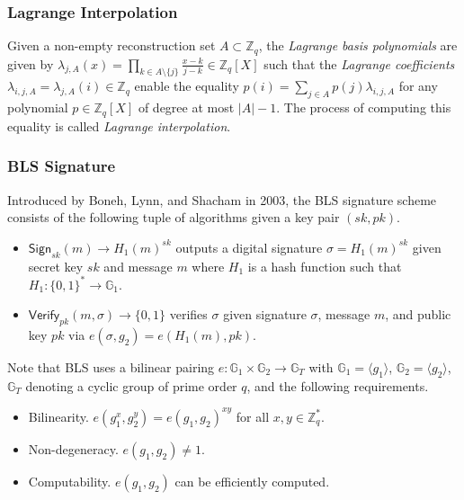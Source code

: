 \documentclass[conference]{IEEEtran}
\theoremstyle{definition}
\theoremstyle{remark}
\begin{document}

\subsubsection{Lagrange Interpolation}
\label{appendix:lagrange}
Given a non-empty reconstruction set $A \subset \mathbb{Z}_q$, the \textit{Lagrange basis polynomials} are given by $\lambda_{j, A}(x) = \prod_{k \in A \setminus \{j\}} \frac{x - k}{j - k} \in \mathbb{Z}_q[X]$ such that the \textit{Lagrange coefficients} $\lambda_{i, j, A} = \lambda_{j, A}(i) \in \mathbb{Z}_q$ enable the equality $p(i) = \sum_{j \in A} p(j) \lambda_{i, j, A}$ for any polynomial $p \in \mathbb{Z}_q[X]$ of degree at most $|A| - 1$. The process of computing this equality is called \textit{Lagrange interpolation}.

\subsubsection{BLS Signature}
\label{appendix:bls}
Introduced by Boneh, Lynn, and Shacham in 2003, the BLS signature scheme \cite{boneh2001short} consists of the following tuple of algorithms given a key pair $(sk, pk)$.
\begin{itemize}
\item $\mathsf{Sign}_{sk}(m) \rightarrow H_1(m)^{sk}$ outputs a digital signature $\sigma = H_1(m)^{sk}$ given secret key $sk$ and message $m$ where $H_1$ is a hash function such that $H_1: \{0, 1\}^* \rightarrow \mathbb{G}_1$.
\item $\mathsf{Verify}_{pk}(m, \sigma) \rightarrow \{0, 1\}$ verifies $\sigma$ given signature $\sigma$, message $m$, and public key $pk$ via $e(\sigma, g_2) = e(H_1(m), pk)$.
\end{itemize}
Note that BLS uses a bilinear pairing $e: \mathbb{G}_1 \times \mathbb{G}_2 \rightarrow \mathbb{G}_T$ with $\mathbb{G}_1 = \langle g_1 \rangle$, $\mathbb{G}_2 = \langle g_2 \rangle$, $\mathbb{G}_T$ denoting a cyclic group of prime order $q$, and the following requirements.
\begin{itemize}
\item Bilinearity. $e(g_1^x, g_2^y) = e(g_1, g_2)^{x y}$ for all $x, y \in \mathbb{Z}^*_q$.
\item Non-degeneracy. $e(g_1, g_2) \neq 1$.
\item Computability. $e(g_1, g_2)$ can be efficiently computed.
\end{itemize}
\end{document}
